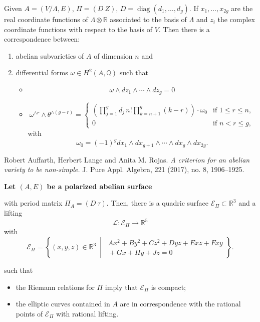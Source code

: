 Given $A=(V/\Lambda,E)$,
$\Pi=(D\ Z)$,
$D=\operatorname{diag}(d_1,\ldots,d_g)$.
If $x_1,\ldots,x_{2g}$ are the real
coordinate functions of
$\Lambda\otimes\mathbb{R}$ associated to
the basis of $\Lambda$ and $z_i$ the
complex coordinate functions with respect
to the basis of $V$. Then there is a
correspondence between:
\begin{enumerate}
\item abelian subvarieties of $A$ of
dimension $n$ and

\item differential forms
$\omega\in H^2(A,\mathbb{Q})$ such that
\begin{itemize}
\item
$$
\omega\wedge dz_1\wedge\cdots\wedge dz_g
=0
$$

\item
$$
\omega^{\wedge r}
\wedge\theta^{\wedge(g-r)}
=
\begin{cases}
\displaystyle
\left(
\prod_{j=1}^g d_j\,n!
\prod_{k=n+1}^g(k-r)
\right)\cdot\omega_0
&\text{if }1\leq r\leq n,\\[8pt]
0
&\text{if }n<r\leq g,
\end{cases}
$$
with
$$
\omega_0=(-1)^g
dx_1\wedge dx_{g+1}\wedge\cdots
\wedge dx_g\wedge dx_{2g}.
$$
\end{itemize}
\end{enumerate}

Robert Auffarth, Herbert Lange and
Anita M. Rojas.
{\it A criterion for an abelian variety
to be non-simple.}
J. Pure Appl. Algebra, 221 (2017),
no. 8, 1906--1925.

\medskip\noindent
{\bf Let $(A,E)$ be a polarized abelian
surface}

with period matrix
$\Pi_A=(D\ \tau)$.
Then, there is a quadric surface
$\mathcal{E}_{\Pi}\subset\mathbb{R}^3$
and a lifting
$$
\mathcal{L}\colon
\mathcal{E}_{\Pi}\longrightarrow
\mathbb{R}^5
$$
with
$$
\mathcal{E}_{\Pi}
=
\left\{
(x,y,z)\in\mathbb{R}^3
\ \middle|\
\begin{aligned}
Ax^2+By^2+Cz^2+Dyz+Exz+Fxy\\
{}+Gx+Hy+Jz=0
\end{aligned}
\right\}.
$$


such that
\begin{itemize}
\item the Riemann relations for $\Pi$
imply that $\mathcal{E}_{\Pi}$ is compact;

\item the elliptic curves contained in $A$
are in correspondence with the rational
points of $\mathcal{E}_{\Pi}$ with
rational lifting.
\end{itemize}


